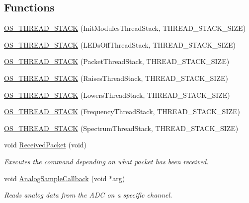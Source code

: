 \subsection*{Functions}
\begin{DoxyCompactItemize}
\item 
\hyperlink{group__main__module_gac2875955d67e96abf6cfa8aaad5e9f75}{O\+S\+\_\+\+T\+H\+R\+E\+A\+D\+\_\+\+S\+T\+A\+C\+K} (Init\+Modules\+Thread\+Stack, T\+H\+R\+E\+A\+D\+\_\+\+S\+T\+A\+C\+K\+\_\+\+S\+I\+Z\+E)
\item 
\hyperlink{group__main__module_ga78e32208fd29f8777453fba66cb23512}{O\+S\+\_\+\+T\+H\+R\+E\+A\+D\+\_\+\+S\+T\+A\+C\+K} (L\+E\+Ds\+Off\+Thread\+Stack, T\+H\+R\+E\+A\+D\+\_\+\+S\+T\+A\+C\+K\+\_\+\+S\+I\+Z\+E)
\item 
\hyperlink{group__main__module_gab4c1c0cd94088cbbb7b7caa74232e2b8}{O\+S\+\_\+\+T\+H\+R\+E\+A\+D\+\_\+\+S\+T\+A\+C\+K} (Packet\+Thread\+Stack, T\+H\+R\+E\+A\+D\+\_\+\+S\+T\+A\+C\+K\+\_\+\+S\+I\+Z\+E)
\item 
\hyperlink{group__main__module_ga05a413cec42e7d893bccc45d54001bb7}{O\+S\+\_\+\+T\+H\+R\+E\+A\+D\+\_\+\+S\+T\+A\+C\+K} (Raises\+Thread\+Stack, T\+H\+R\+E\+A\+D\+\_\+\+S\+T\+A\+C\+K\+\_\+\+S\+I\+Z\+E)
\item 
\hyperlink{group__main__module_ga74d9df5a06cceec1b45c61e69c6d1718}{O\+S\+\_\+\+T\+H\+R\+E\+A\+D\+\_\+\+S\+T\+A\+C\+K} (Lowers\+Thread\+Stack, T\+H\+R\+E\+A\+D\+\_\+\+S\+T\+A\+C\+K\+\_\+\+S\+I\+Z\+E)
\item 
\hyperlink{group__main__module_gaf1afd8f3ce4eedf9ad5254b8750ad1fa}{O\+S\+\_\+\+T\+H\+R\+E\+A\+D\+\_\+\+S\+T\+A\+C\+K} (Frequency\+Thread\+Stack, T\+H\+R\+E\+A\+D\+\_\+\+S\+T\+A\+C\+K\+\_\+\+S\+I\+Z\+E)
\item 
\hyperlink{group__main__module_ga9abdf6124e333220d024a49b5ce39883}{O\+S\+\_\+\+T\+H\+R\+E\+A\+D\+\_\+\+S\+T\+A\+C\+K} (Spectrum\+Thread\+Stack, T\+H\+R\+E\+A\+D\+\_\+\+S\+T\+A\+C\+K\+\_\+\+S\+I\+Z\+E)
\item 
void \hyperlink{group__main__module_gaf57dd4c5e7e444cfe5571d411f9548c9}{Received\+Packet} (void)
\begin{DoxyCompactList}\small\item\em Executes the command depending on what packet has been received. \end{DoxyCompactList}\item 
void \hyperlink{group__main__module_ga5bb615c293d6b116d3c327bd223f2a4a}{Analog\+Sample\+Callback} (void $\ast$arg)
\begin{DoxyCompactList}\small\item\em Reads analog data from the A\+D\+C on a specific channel. \end{DoxyCompactList}\item 

\end{DoxyCompactItemize}

